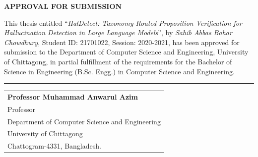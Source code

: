 \thispagestyle{plain}
\begin{center}

\begin{center}
 \Large {\bf \uppercase{Approval for Submission}}
\end{center}
\vspace{3\baselineskip}

\noindent
\begin{justify}
This thesis entitled ``\emph{HalDetect: Taxonomy-Routed Proposition Verification for Hallucination Detection in Large Language Models}'', by \textit{Sahib Abbas Bahar Chowdhury}, Student ID: 21701022, Session: 2020-2021, has been approved for submission to the Department of Computer Science and Engineering, University of Chittagong, in partial fulfillment of the requirements for the Bachelor of Science in Engineering (B.Sc. Engg.) in Computer Science and Engineering.
\end{justify}

\vspace{4\baselineskip}
\begin{flushright}
\begin{minipage}[c]{0.63\textwidth}
\centering
\hrule 
\vspace{0.5\baselineskip}
\begin{tabular}{l}
\large \textbf{Professor Muhammad Anwarul Azim}\\
Professor\\
Department of Computer Science and Engineering\\
University of Chittagong\\
Chattogram-4331, Bangladesh.\\
\end{tabular}
\end{minipage}
\end{flushright}

\end{center}
